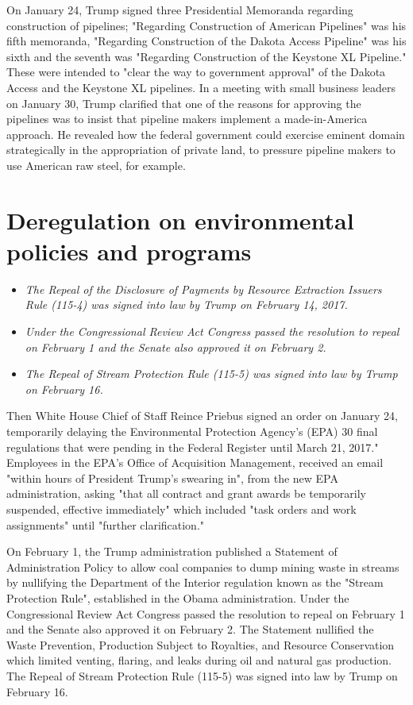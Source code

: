 On January 24, Trump signed three Presidential Memoranda regarding
construction of pipelines; "Regarding Construction of American
Pipelines" was his fifth memoranda, "Regarding Construction of the
Dakota Access Pipeline" was his sixth and the seventh was "Regarding
Construction of the Keystone XL Pipeline." These were intended to "clear
the way to government approval" of the Dakota Access and the Keystone XL
pipelines. In a meeting with small business leaders on January 30, Trump
clarified that one of the reasons for approving the pipelines was to
insist that pipeline makers implement a made-in-America approach. He
revealed how the federal government could exercise eminent domain
strategically in the appropriation of private land, to pressure pipeline
makers to use American raw steel, for example.

\section{Deregulation on environmental policies and
programs}\label{deregulation-on-environmental-policies-and-programs}

\begin{itemize}
\item
  \emph{The Repeal of the Disclosure of Payments by Resource Extraction
  Issuers Rule (115-4) was signed into law by Trump on February 14,
  2017.}
\item
  \emph{Under the Congressional Review Act Congress passed the
  resolution to repeal on February 1 and the Senate also approved it on
  February 2.}
\item
  \emph{The Repeal of Stream Protection Rule (115-5) was signed into law
  by Trump on February 16.}
\end{itemize}

Then White House Chief of Staff Reince Priebus signed an order on
January 24, temporarily delaying the Environmental Protection Agency's
(EPA) 30 final regulations that were pending in the Federal Register
until March 21, 2017." Employees in the EPA's Office of Acquisition
Management, received an email "within hours of President Trump's
swearing in", from the new EPA administration, asking "that all contract
and grant awards be temporarily suspended, effective immediately" which
included "task orders and work assignments" until "further
clarification."

On February 1, the Trump administration published a Statement of
Administration Policy to allow coal companies to dump mining waste in
streams by nullifying the Department of the Interior regulation known as
the "Stream Protection Rule", established in the Obama administration.
Under the Congressional Review Act Congress passed the resolution to
repeal on February 1 and the Senate also approved it on February 2. The
Statement nullified the Waste Prevention, Production Subject to
Royalties, and Resource Conservation which limited venting, flaring, and
leaks during oil and natural gas production. The Repeal of Stream
Protection Rule (115-5) was signed into law by Trump on February 16.

